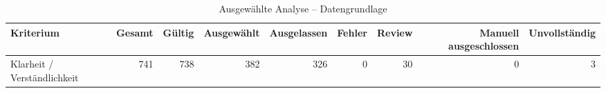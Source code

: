 \begin{table}[htbp]
\centering
\caption{Ausgewählte Analyse -- Datengrundlage}
\begin{tabular}{lrrrrrrrr}
\toprule
Kriterium & Gesamt & Gültig & Ausgewählt & Ausgelassen & Fehler & Review & Manuell ausgeschlossen & Unvollständig \\
\midrule
Klarheit / Verständlichkeit & 741 & 738 & 382 & 326 & 0 & 30 & 0 & 3 \\
\bottomrule
\end{tabular}
\end{table}
